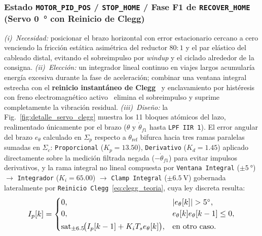 \subsubsection{Estado \texttt{MOTOR\_PID\_POS} / \texttt{STOP\_HOME} / Fase F1 de \texttt{RECOVER\_HOME} (Servo \qty{0}{\degree} con Reinicio de Clegg)}



\textit{(i)~Necesidad:} posicionar el brazo horizontal con error estacionario cercano a cero venciendo la fricción estática asimétrica del reductor $80:1$ y el par elástico del cableado distal, evitando el sobreimpulso por \textit{windup} y el ciclado alrededor de la consigna.
\textit{(ii)~Elección:} un integrador lineal continuo en viajes largos acumularía energía excesiva durante la fase de aceleración; combinar una ventana integral estrecha con el \textbf{reinicio instantáneo de Clegg}~\cite{clegg1958} y enclavamiento por histéresis con freno electromagnético activo~\cite{L298N_Datasheet} elimina el sobreimpulso y suprime completamente la vibración residual.
\textit{(iii)~Diseño:} la Fig.~\ref{fig:detalle_servo_clegg} muestra los 11 bloques atómicos del lazo, realimentado únicamente por el brazo ($\theta$ y $\dot{\theta}_{f1}$ hasta \texttt{LPF IIR 1}). El error angular del brazo $e_\theta$ calculado en $\Sigma_p$ respecto a $\theta_{\text{ref}}$ bifurca hacia tres ramas paralelas sumadas en $\Sigma_c$: \texttt{Proporcional} ($K_p=13.50$), \texttt{Derivativo} ($K_d=1.45$) aplicado directamente sobre la medición filtrada negada ($-\dot{\theta}_{f1}$) para evitar impulsos derivativos, y la rama integral no lineal compuesta por \texttt{Ventana Integral} ($\pm\qty{5}{\degree}$) $\to$ \texttt{Integrador} ($K_i=65.00$) $\to$ \texttt{Clamp Integral} ($\pm\qty{6.5}{\volt}$) gobernada lateralmente por \texttt{Reinicio Clegg}~\eqref{eq:clegg_teoria}, cuya ley discreta resulta:
\begin{equation}
\resizebox{0.85\columnwidth}{!}{$\displaystyle
    I_p[k] =
    \begin{cases}
        0, & |e_\theta[k]| > \qty{5}{\degree}, \\
        0, & e_\theta[k]e_\theta[k-1] \le 0, \\[2pt]
        \mathrm{sat}_{\pm 6.5}\!\bigl(I_p[k-1] + K_i T_s e_\theta[k]\bigr), & \text{en otro caso}.
    \end{cases}
$}
    \label{eq:clegg_pos}
\end{equation}
